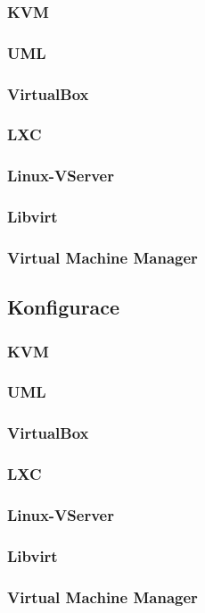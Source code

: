 \subsubsection{KVM}
\subsubsection{UML}
\subsubsection{VirtualBox}
\subsubsection{LXC}
\subsubsection{Linux-VServer}
\subsubsection{Libvirt}
\subsubsection{Virtual Machine Manager}

\subsection{Konfigurace}
\subsubsection{\xen}
\subsubsection{KVM}
\subsubsection{UML}
\subsubsection{VirtualBox}
\subsubsection{LXC}
\subsubsection{Linux-VServer}
\subsubsection{Libvirt}
\subsubsection{Virtual Machine Manager}
